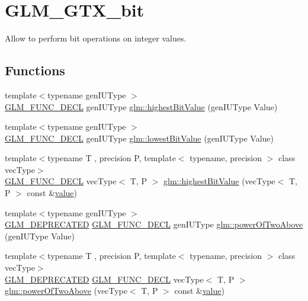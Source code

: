 \hypertarget{group__gtx__bit}{}\section{G\+L\+M\+\_\+\+G\+T\+X\+\_\+bit}
\label{group__gtx__bit}


Allow to perform bit operations on integer values.  


\subsection*{Functions}
\begin{DoxyCompactItemize}
\item 
{\footnotesize template$<$typename gen\+I\+U\+Type $>$ }\\\mbox{\hyperlink{setup_8hpp_ab2d052de21a70539923e9bcbf6e83a51}{G\+L\+M\+\_\+\+F\+U\+N\+C\+\_\+\+D\+E\+CL}} gen\+I\+U\+Type \mbox{\hyperlink{group__gtx__bit_ga0dcc8fe7c3d3ad60dea409281efa3d05}{glm\+::highest\+Bit\+Value}} (gen\+I\+U\+Type Value)
\item 
{\footnotesize template$<$typename gen\+I\+U\+Type $>$ }\\\mbox{\hyperlink{setup_8hpp_ab2d052de21a70539923e9bcbf6e83a51}{G\+L\+M\+\_\+\+F\+U\+N\+C\+\_\+\+D\+E\+CL}} gen\+I\+U\+Type \mbox{\hyperlink{group__gtx__bit_ga2ff6568089f3a9b67f5c30918855fc6f}{glm\+::lowest\+Bit\+Value}} (gen\+I\+U\+Type Value)
\item 
{\footnotesize template$<$typename T , precision P, template$<$ typename, precision $>$ class vec\+Type$>$ }\\\mbox{\hyperlink{setup_8hpp_ab2d052de21a70539923e9bcbf6e83a51}{G\+L\+M\+\_\+\+F\+U\+N\+C\+\_\+\+D\+E\+CL}} vec\+Type$<$ T, P $>$ \mbox{\hyperlink{group__gtx__bit_ga5eea3a4d429040af13d39a7d7cd84d73}{glm\+::highest\+Bit\+Value}} (vec\+Type$<$ T, P $>$ const \&\mbox{\hyperlink{glad_8h_a03aff08f73d7fde3d1a08e0abd8e84fa}{value}})
\item 
{\footnotesize template$<$typename gen\+I\+U\+Type $>$ }\\\mbox{\hyperlink{setup_8hpp_a8edfb48cdc249a3ee48406bf179023dc}{G\+L\+M\+\_\+\+D\+E\+P\+R\+E\+C\+A\+T\+ED}} \mbox{\hyperlink{setup_8hpp_ab2d052de21a70539923e9bcbf6e83a51}{G\+L\+M\+\_\+\+F\+U\+N\+C\+\_\+\+D\+E\+CL}} gen\+I\+U\+Type \mbox{\hyperlink{group__gtx__bit_ga8cda2459871f574a0aecbe702ac93291}{glm\+::power\+Of\+Two\+Above}} (gen\+I\+U\+Type Value)
\item 
{\footnotesize template$<$typename T , precision P, template$<$ typename, precision $>$ class vec\+Type$>$ }\\\mbox{\hyperlink{setup_8hpp_a8edfb48cdc249a3ee48406bf179023dc}{G\+L\+M\+\_\+\+D\+E\+P\+R\+E\+C\+A\+T\+ED}} \mbox{\hyperlink{setup_8hpp_ab2d052de21a70539923e9bcbf6e83a51}{G\+L\+M\+\_\+\+F\+U\+N\+C\+\_\+\+D\+E\+CL}} vec\+Type$<$ T, P $>$ \mbox{\hyperlink{group__gtx__bit_gafe08808a50226b75b50e640a08b32ddc}{glm\+::power\+Of\+Two\+Above}} (vec\+Type$<$ T, P $>$ const \&\mbox{\hyperlink{glad_8h_a03aff08f73d7fde3d1a08e0abd8e84fa}{value}})

\end{DoxyCompactItemize}
